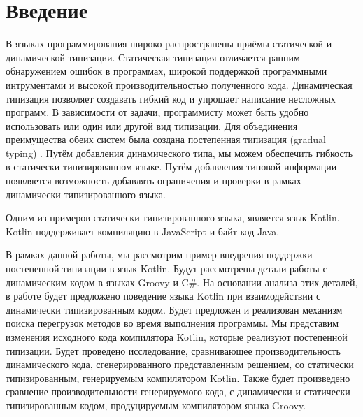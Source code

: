 \section*{Введение}

В языках программирования широко распространены приёмы статической и динамической типизации. Статическая типизация отличается ранним обнаружением ошибок в программах, широкой поддержкой программными интрументами и высокой производительностью полученного кода. Динамическая типизация позволяет создавать гибкий код и упрощает написание несложных программ. 
В зависимости от задачи, программисту может быть удобно использовать или один или другой вид типизации. Для объединения преимущества обеих систем была создана постепенная типизация (gradual typing) \cite{gradual:siek2006gradual}. Путём добавления динамического типа, мы можем обеспечить гибкость в статически типизированном языке. Путём добавления типовой информации появляется возможность добавлять ограничения и проверки в рамках динамически типизированного языка.

Одним из примеров статически типизированного языка, является язык Kotlin. 
Kotlin поддерживает компиляцию в JavaScript и байт-код Java.

В рамках данной работы, мы рассмотрим пример внедрения поддержки постепенной типизации в язык Kotlin. Будут рассмотрены детали работы с динамическим кодом в языках Groovy и C\#. На основании анализа этих деталей, в работе будет предложено поведение языка Kotlin при взаимодействии с динамически типизированным кодом. Будет предложен и реализован механизм поиска перегрузок методов во время выполнения программы. Мы представим изменения исходного кода компилятора Kotlin, которые реализуют постепенной типизации. Будет проведено исследование, сравнивающее производительность динамического кода, сгенерированного представленным решением, со статически типизированным, генерируемым компилятором Kotlin. Также будет произведено сравнение производительности генерируемого кода, с динамически и статически типизированным кодом, продуцируемым компилятором языка Groovy.



